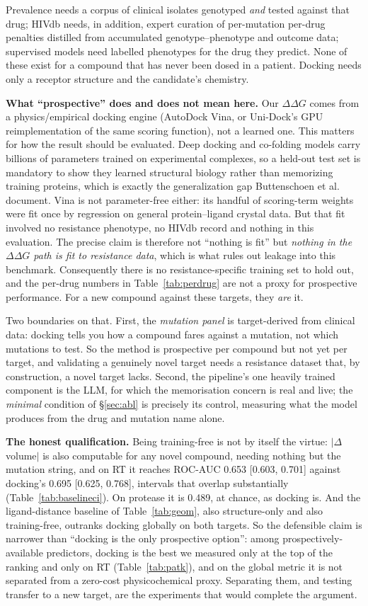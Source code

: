 \documentclass{article}
\newcommand{\ddg}{\ensuremath{\Delta\Delta G}}
\begin{document}
Prevalence needs a corpus of clinical isolates genotyped \emph{and} tested against
that drug; HIVdb needs, in addition, expert curation of per-mutation per-drug
penalties distilled from accumulated genotype--phenotype and outcome data;
supervised models need labelled phenotypes for the drug they predict. None of
these exist for a compound that has never been dosed in a patient. Docking needs
only a receptor structure and the candidate's chemistry.

\textbf{What ``prospective'' does and does not mean here.} Our \ddg{} comes from a
physics/empirical docking engine (AutoDock Vina, or Uni-Dock's GPU
reimplementation of the same scoring function), not a learned one. This matters
for how the result should be evaluated. Deep docking and co-folding models
\citep{boltz2} carry billions of parameters trained on experimental complexes, so
a held-out test set is mandatory to show they learned structural biology rather
than memorizing training proteins, which is exactly the generalization gap
Buttenschoen et al.~\citep{posebusters} document. Vina is not parameter-free either: its handful of
scoring-term weights were fit once by regression on general protein--ligand
crystal data. But that fit involved no resistance phenotype, no HIVdb record and
nothing in this evaluation. The precise claim is therefore not ``nothing is
fit'' but \emph{nothing in the \ddg{} path is fit to resistance data}, which is
what rules out leakage into this benchmark. Consequently there is no
resistance-specific training set to hold out, and the per-drug numbers in
Table~\ref{tab:perdrug} are not a proxy for prospective performance. For a new
compound against these targets, they \emph{are} it.

Two boundaries on that. First, the \emph{mutation panel} is target-derived from
clinical data: docking tells you how a compound fares against a mutation, not
which mutations to test. So the method is prospective per compound but not yet
per target, and validating a genuinely novel target needs a resistance dataset
that, by construction, a novel target lacks. Second, the pipeline's one heavily
trained component is the LLM, for which the memorisation concern is real and
live; the \emph{minimal} condition of \S\ref{sec:abl} is precisely its control,
measuring what the model produces from the drug and mutation name alone.

\textbf{The honest qualification.} Being training-free is not by itself the
virtue: $|\Delta$volume$|$ is also computable for any novel compound, needing
nothing but the mutation string, and on RT it reaches ROC-AUC 0.653
[0.603, 0.701] against docking's 0.695 [0.625, 0.768], intervals that overlap
substantially (Table~\ref{tab:baselineci}). On protease it is 0.489, at chance,
as docking is. And the ligand-distance baseline of Table~\ref{tab:geom}, also structure-only
and also training-free, outranks docking globally on both targets. So the
defensible claim is narrower than ``docking is the only prospective option'':
among prospectively-available predictors, docking is the best we measured only at
the top of the ranking and only on RT (Table~\ref{tab:patk}), and on the global
metric it is not separated from a zero-cost physicochemical proxy. Separating
them, and testing transfer to a new target, are the experiments that would
complete the argument.
\end{document}
